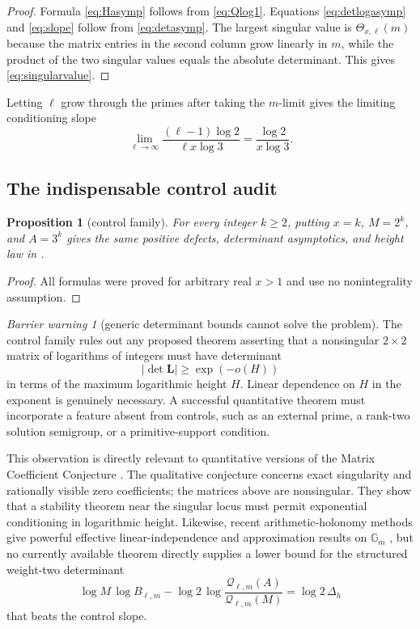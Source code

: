 \documentclass[11pt]{article}
\numberwithin{equation}{section}
\newtheorem{proposition}[theorem]{Proposition}
\theoremstyle{definition}
\theoremstyle{remark}
\newtheorem{warning}[theorem]{Barrier warning}
\begin{document}
\begin{proof}
Formula \eqref{eq:Hasymp} follows from \eqref{eq:Qlog1}.  Equations \eqref{eq:detlogasymp} and \eqref{eq:slope} follow from \eqref{eq:detasymp}.  The largest singular value is $\Theta_{x,\ell}(m)$ because the matrix entries in the second column grow linearly in $m$, while the product of the two singular values equals the absolute determinant.  This gives \eqref{eq:singularvalue}.
\end{proof}

Letting $\ell$ grow through the primes after taking the $m$-limit gives the limiting conditioning slope
\begin{equation}\label{eq:elllimit}
  \lim_{\ell\to\infty}
  \frac{(\ell-1)\log2}{\ell x\log3}
  =\frac{\log2}{x\log3}.
\end{equation}

\subsection{The indispensable control audit}

\begin{proposition}[control family]\label{prop:controls}
For every integer $k\ge2$, putting $x=k$, $M=2^k$, and $A=3^k$ gives the same positive defects, determinant asymptotics, and height law in .
\end{proposition}

\begin{proof}
All formulas were proved for arbitrary real $x>1$ and use no nonintegrality assumption.
\end{proof}

\begin{warning}[generic determinant bounds cannot solve the problem]
The control family rules out any proposed theorem asserting that a nonsingular $2\times2$ matrix of logarithms of integers must have determinant
\[
  |\det\mathbf L|\ge \exp(-o(H))
\]
in terms of the maximum logarithmic height $H$.  Linear dependence on $H$ in the exponent is genuinely necessary.  A successful quantitative theorem must incorporate a feature absent from controls, such as an external prime, a rank-two solution semigroup, or a primitive-support condition.
\end{warning}

This observation is directly relevant to quantitative versions of the Matrix Coefficient Conjecture \cite{DasguptaKakde}.  The qualitative conjecture concerns exact singularity and rationally visible zero coefficients; the matrices above are nonsingular.  They show that a stability theorem near the singular locus must permit exponential conditioning in logarithmic height.  Likewise, recent arithmetic-holonomy methods give powerful effective linear-independence and approximation results on $\mathbb G_m$ \cite{CDTHolonomy}, but no currently available theorem directly supplies a lower bound for the structured weight-two determinant
\begin{equation}\label{eq:weighttwo}
  \log M\,\log B_{\ell,m}
  -\log2\,\log\frac{\mathcal Q_{\ell,m}(A)}{\mathcal Q_{\ell,m}(M)}
  =\log2\,\Delta_h
\end{equation}
that beats the control slope.
\end{document}
